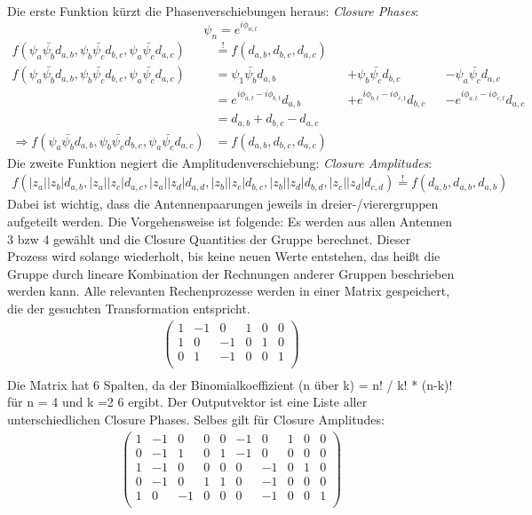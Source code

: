 \documentclass[]{dsadokumentation}
\begin{document}
Die erste Funktion kürzt die Phasenverschiebungen heraus:
\emph{Closure Phases}:
$$\psi_n = e^{i \phi_{n,t}}$$
\begin{align*}
f(\psi_a\bar{\psi_b} d_{a,b},\psi_b\bar{\psi_c}d_{b,c},\psi_a \bar{\psi_c} d_{a,c})&\overset{!}{=}f(d_{a,b},d_{b,c},d_{a,c})\\
f(\psi_a\bar{\psi_b} d_{a,b},\psi_b\bar{\psi_c}d_{b,c},\psi_a \bar{\psi_c} d_{a,c})&=\psi_1\bar{\psi_b}d_{a,b}&&+\psi_b\bar{\psi_c}d_{b,c}&&-\psi_a \bar{\psi_c} d_{a,c}\\
&=e^{i \phi_{a,t}-i\phi_{b,t}}d_{a,b}&&+e^{i \phi_{b,t}-i\phi_{c,t}}d_{b,c}&&-e^{i \phi_{a,t}-i\phi_{c,t}}d_{a,c}\\
&=d_{a,b}+d_{b,c}-d_{a,c}\\
\Rightarrow f(\psi_a\bar{\psi_b} d_{a,b},\psi_b\bar{\psi_c}d_{b,c},\psi_a \bar{\psi_c} d_{a,c})&=f(d_{a,b},d_{b,c},d_{a,c})
\end{align*}
Die zweite Funktion negiert die Amplitudenverschiebung:
\emph{Closure Amplitudes}:
\begin{align*}
f(|z_a||z_b|d_{a, b}, |z_a||z_c|d_{a, c}, |z_a||z_d|d_{a, d}, |z_b||z_c|d_{b, c}, |z_b||z_d|d_{b, d}, |z_c||z_d|d_{c, d})\overset{!}{=}f(d_{a, b}, d_{a, b}, d_{a, b})
\end{align*}
Dabei ist wichtig, dass die Antennenpaarungen jeweils in dreier-/vierergruppen aufgeteilt werden. Die Vorgehensweise ist folgende: Es werden aus allen Antennen 3 bzw 4 gewählt und die Closure Quantities der Gruppe berechnet. Dieser Prozess wird solange wiederholt, bis keine neuen Werte entstehen, das heißt die Gruppe durch lineare Kombination der Rechnungen anderer Gruppen beschrieben werden kann. Alle relevanten Rechenprozesse werden in einer Matrix gespeichert, die der gesuchten Transformation entspricht.
\begin{gather*}
\begin{pmatrix}
1&-1&0&1&0&0 \\
1&0&-1&0&1&0 \\
0&1&-1&0&0&1 \\
\end{pmatrix}\\
\end{gather*}
Die Matrix hat 6 Spalten, da der Binomialkoeffizient (n über k) = n! / k! * (n-k)! für n = 4 und k =2 6 ergibt. Der Outputvektor ist eine Liste aller unterschiedlichen Closure Phases. Selbes gilt für Closure Amplitudes:
\begin{gather*}
\begin{pmatrix}
1&-1&0&0&0&-1&0&1&0&0 \\
0&-1&1&0&1&-1&0&0&0&0 \\
1&-1&0&0&0&0&-1&0&1&0 \\
0&-1&0&1&1&0&-1&0&0&0 \\
1&0&-1&0&0&0&-1&0&0&1 \\
\end{pmatrix}
\end{gather*}
\end{document}
